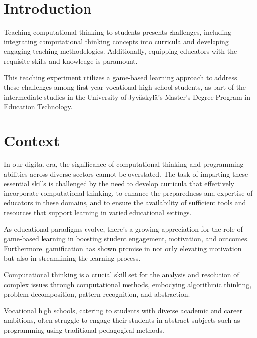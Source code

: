 \documentclass[final,5p,times,twocolumn,authoryear]{elsarticle}
\begin{document}



\section{Introduction}
\label{introduction}

Teaching computational thinking to students presents challenges, including integrating computational thinking concepts into curricula and developing engaging teaching methodologies. Additionally, equipping educators with the requisite skills and knowledge is paramount. \citep{angeli2020computational}

This teaching experiment utilizes a game-based learning approach to address these challenges among first-year vocational high school students, as part of the intermediate studies in the University of Jyväskylä’s Master's Degree Program in Education Technology.


\section{Context}

In our digital era, the significance of computational thinking and programming abilities across diverse sectors cannot be overstated. The task of imparting these essential skills is challenged by the need to develop curricula that effectively incorporate computational thinking, to enhance the preparedness and expertise of educators in these domains, and to ensure the availability of sufficient tools and resources that support learning in varied educational settings. \citep{angeli2020computational}

As educational paradigms evolve, there's a growing appreciation for the role of game-based learning in boosting student engagement, motivation, and outcomes. \citep{greipl2020potential}
Furthermore, gamification has shown promise in not only elevating motivation but also in streamlining the learning process. \citep{liu2020using}

Computational thinking is a crucial skill set for the analysis and resolution of complex issues through computational methods, embodying algorithmic thinking, problem decomposition, pattern recognition, and abstraction.
\citep{wing2006computational}

Vocational high schools, catering to students with diverse academic and career ambitions, often struggle to engage their students in abstract subjects such as programming using traditional pedagogical methods.
\citep{freeman2014active}
\end{document}
